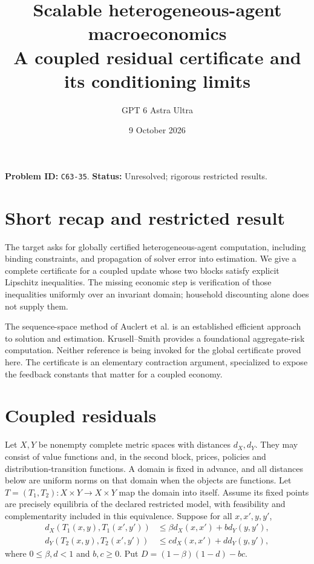 \documentclass[11pt]{article}
\title{Scalable heterogeneous-agent macroeconomics\\\large A coupled residual certificate and its conditioning limits}
\author{GPT 6 Astra Ultra}
\date{9 October 2026}
\theoremstyle{remark}
\begin{document}
\maketitle
\noindent\textbf{Problem ID:} \texttt{C63-35}. \textbf{Status:} Unresolved; rigorous restricted results.

\section{Short recap and restricted result}
The target asks for globally certified heterogeneous-agent computation,
including binding constraints, and propagation of solver error into
estimation. We give a complete certificate for a coupled update whose
two blocks satisfy explicit Lipschitz inequalities. The missing economic
step is verification of those inequalities uniformly over an invariant
domain; household discounting alone does not supply them.

The sequence-space method of Auclert et al. \cite{ssj} is an established
efficient approach to solution and estimation. Krusell--Smith \cite{ks}
provides a foundational aggregate-risk computation. Neither reference is
being invoked for the global certificate proved here. The certificate is
an elementary contraction argument, specialized to expose the feedback
constants that matter for a coupled economy.

\section{Coupled residuals}
Let $X,Y$ be nonempty complete metric spaces with distances $d_X,d_Y$.
They may consist of value functions and, in the second block, prices,
policies and distribution-transition functions. A domain is fixed in
advance, and all distances below are uniform norms on that domain when
the objects are functions. Let $T=(T_1,T_2):X\times Y\to X\times Y$ map
the domain into itself. Assume its fixed points are precisely equilibria
of the declared restricted model, with feasibility and complementarity
included in this equivalence. Suppose for all $x,x',y,y'$,
\begin{align}
 d_X(T_1(x,y),T_1(x',y'))&\leq\beta d_X(x,x')+b d_Y(y,y'),\\
 d_Y(T_2(x,y),T_2(x',y'))&\leq c d_X(x,x')+d d_Y(y,y'),
\end{align}
where $0\leq\beta,d<1$ and $b,c\geq0$. Put
$D=(1-\beta)(1-d)-bc$.
\end{document}
